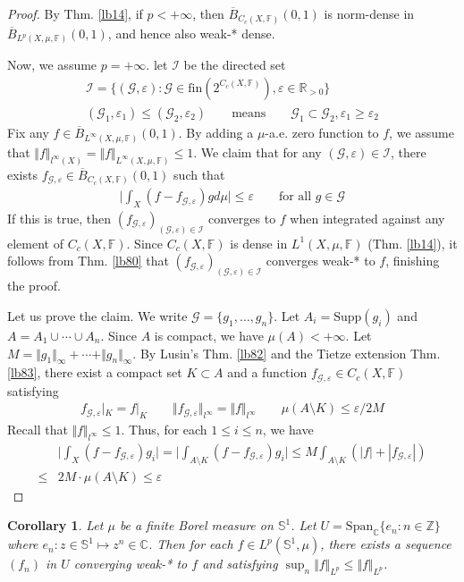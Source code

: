 \documentclass[12pt,b5paper,notitlepage]{article}
\theoremstyle{definition}
\theoremstyle{plain}
\newtheorem{co}[df]{Corollary}
\newcommand{\ovl}{\overline}
\newcommand{\Span}{\mathrm{Span}}
\newcommand{\scr}{\mathscr}
\newcommand{\Cbb}{\mathbb C}
\newcommand{\Zbb}{\mathbb Z}
\newcommand{\Rbb}{\mathbb R}
\newcommand{\Sbb}{{\mathbb S}}
\newcommand{\fin}{\mathrm{fin}}
\newcommand{\Supp}{\mathrm{Supp}}
\newcommand{\Fbb}{\mathbb F}
\newcommand{\eps}{\varepsilon}
\newcommand{\MG}{\mathcal G}
\numberwithin{equation}{section}
\begin{document}
\begin{proof}
By Thm. \ref{lb14}, if $p<+\infty$, then $\ovl B_{C_c(X,\Fbb)}(0,1)$ is norm-dense in $\ovl B_{L^p(X,\mu,\Fbb)}(0,1)$, and hence also weak-* dense.

Now, we assume $p=+\infty$. let $\scr I$ be the directed set
\begin{gather*}
\scr I=\{(\MG,\eps):\MG\in\fin(2^{C_c(X,\Fbb)}),\eps\in\Rbb_{>0}\}\\
(\MG_1,\eps_1)\leq(\MG_2,\eps_2)\qquad\text{means}\qquad \MG_1\subset\MG_2,\eps_1\geq\eps_2
\end{gather*}
Fix any $f\in \ovl B_{L^\infty(X,\mu,\Fbb)}(0,1)$. By adding a $\mu$-a.e. zero function to $f$, we assume that $\Vert f\Vert_{l^\infty(X)}=\Vert f\Vert_{L^\infty(X,\mu,\Fbb)}\leq 1$. We claim that for any $(\MG,\eps)\in\scr I$, there exists $f_{\MG,\eps}\in \ovl B_{C_c(X,\Fbb)}(0,1)$ such that
\begin{align*}
\Big| \int_X (f-f_{\MG,\eps})gd\mu\Big|\leq\eps\qquad\text{for all }g\in\MG
\end{align*}
If this is true, then $(f_{\MG,\eps})_{(\MG,\eps)\in\scr I}$ converges to $f$ when integrated against any element of $C_c(X,\Fbb)$. Since $C_c(X,\Fbb)$ is dense in $L^1(X,\mu,\Fbb)$ (Thm. \ref{lb14}), it follows from Thm. \ref{lb80} that $(f_{\MG,\eps})_{(\MG,\eps)\in\scr I}$ converges weak-* to $f$, finishing the proof.

Let us prove the claim. We write $\MG=\{g_1,\dots,g_n\}$. Let $A_i=\Supp(g_i)$ and $A=A_1\cup\cdots\cup A_n$. Since $A$ is compact, we have $\mu(A)<+\infty$. Let $M=\Vert g_1\Vert_\infty+\cdots+\Vert g_n\Vert_\infty$. By Lusin's Thm. \ref{lb82} and the Tietze extension Thm. \ref{lb83}, there exist a compact set $K\subset A$ and a function $f_{\MG,\eps}\in C_c(X,\Fbb)$ satisfying
\begin{align*}
f_{\MG,\eps}|_K=f|_K\qquad\Vert f_{\MG,\eps}\Vert_{l^\infty}=\Vert f\Vert_{l^\infty}\qquad \mu(A\setminus K)\leq\eps/2M
\end{align*}
Recall that $\Vert f\Vert_{l^\infty}\leq 1$. Thus, for each $1\leq i\leq n$, we have
\begin{align*}
&\Big| \int_X (f-f_{\MG,\eps})g_i\Big|=\Big| \int_{A\setminus K} (f-f_{\MG,\eps})g_i\Big|\leq M\int_{A\setminus K}(|f|+|f_{\MG,\eps}|)\\
\leq&2M\cdot \mu(A\setminus K)\leq \eps
\end{align*}
\end{proof}


\begin{co}
Let $\mu$ be a finite Borel measure on $\Sbb^1$. Let $U=\Span_\Cbb\{e_n:n\in\Zbb\}$ where $e_n:z\in\Sbb^1\mapsto z^n\in\Cbb$. Then for each $f\in L^p(\Sbb^1,\mu)$, there exists a sequence $(f_n)$ in $U$ converging weak-* to $f$ and satisfying $\sup_n\Vert f\Vert_{L^p}\leq\Vert f\Vert_{L^p}$.
\end{co}
\end{document}
